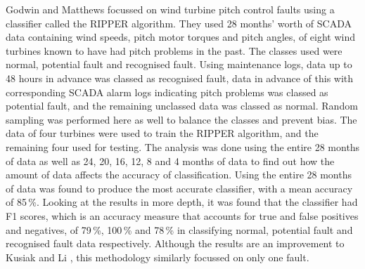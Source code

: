 Godwin and Matthews \cite{Godwi13} focussed on wind turbine pitch control
faults using a classifier called the RIPPER algorithm. They used 28 months'
worth of SCADA data containing wind speeds, pitch motor torques and pitch
angles, of eight wind turbines known to have had pitch problems in the past.
The classes used were normal, potential fault and recognised fault. Using
maintenance logs, data up to 48 hours in advance was classed as recognised
fault, data in advance of this with corresponding SCADA alarm logs indicating
pitch problems was classed as potential fault, and the remaining unclassed
data was classed as normal. Random sampling was performed here as well to
balance the classes and prevent bias. The data of four turbines were used to
train the RIPPER algorithm, and the remaining four used for testing. The
analysis was done using the entire 28 months of data as well as 24, 20, 16,
12, 8 and 4 months of data to find out how the amount of data affects the
accuracy of classification. Using the entire 28 months of data was found to
produce the most accurate classifier, with a mean accuracy of 85\,\%. Looking
at the results in more depth, it was found that the classifier had F1 scores,
which is an accuracy measure that accounts for true and false positives and
negatives, of 79\,\%, 100\,\% and 78\,\% in classifying normal, potential
fault and recognised fault data respectively. Although the results are an
improvement to Kusiak and Li \cite{Kusia11}, this methodology similarly
focussed on only one fault.

